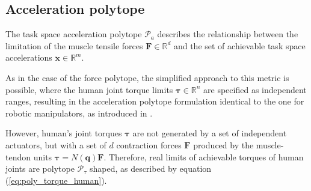 \subsection{Acceleration polytope}
\label{ch:human_aceleration_poly}

The task space acceleration polytope $\mathcal{P}_a$ describes the relationship between the limitation of the muscle tensile forces $\bm{F}\in \mathbb{R}^d$ and the set of achievable task space accelerations $\ddot{\bm{x}}\in\mathbb{R}^m$.

As in the case of the force polytope, the simplified approach to this metric is possible, where the human joint torque limits $\bm{\tau}\in\mathbb{R}^n$ are specified as independent ranges, resulting in the acceleration polytope formulation identical to the one for robotic manipulators, as introduced in . 

However, human's joint torques $\bm{\tau}$ are not generated by a set of independent actuators, but with a set of $d$ contraction forces $\bm{F}$ produced by the muscle-tendon units $\bm{\tau}=N(\bm{q}) \bm{F}$. Therefore, real limits of achievable torques of human joints are polytope $\mathcal{P}_\tau$ shaped, as described by equation (\ref{eq:poly_torque_human}). 

